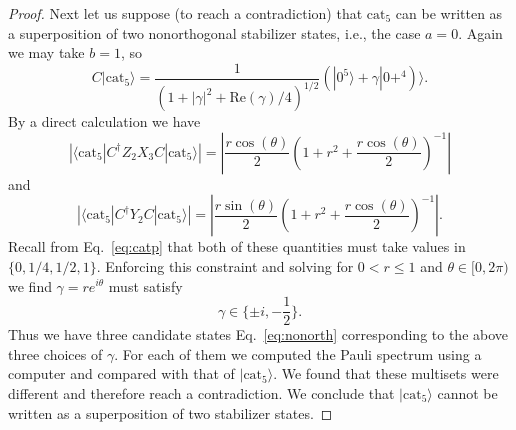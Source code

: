 \documentclass[a4paper,onecolumn,11pt,accepted=2021-11-11]{quantumarticle}
\newcommand{\cat}{\text{cat}}
\begin{document}
\begin{proof}
Next let us suppose  (to reach a contradiction) that $\cat_5$ can be written as a superposition of two nonorthogonal stabilizer states, i.e., the case $a=0$. Again we may take $b=1$, so 
\begin{equation}
C|\cat_5\rangle=\frac{1}{\left(1+|\gamma|^2+\mathrm{Re}(\gamma)/4\right)^{1/2}}(|0^5\rangle+\gamma |0+^{4})\rangle.
\label{eq:nonorth}
\end{equation}
By a direct calculation we have
\[
\left|\langle \cat_5|C^{\dagger}Z_2X_3C|\cat_5\rangle\right|=\left|\frac{r\cos(\theta)}{2}\left(1+r^2+\frac{r\cos(\theta)}{2}\right)^{-1}\right|
\]
and
\[
\left|\langle \cat_5|C^{\dagger}Y_2C|\cat_5\rangle\right|=\left|\frac{r\sin(\theta)}{2}\left(1+r^2+\frac{r\cos(\theta)}{2}\right)^{-1}\right|.
\]
Recall from Eq.~\eqref{eq:catp} that both of these quantities must take values in $\{0,1/4,1/2,1\}$. Enforcing this constraint and solving for $0<r\leq 1$ and $\theta\in [0,2\pi)$ we find $\gamma=re^{i\theta}$ must satisfy
\[
\gamma \in \{\pm i,  -\frac{1}{2}\}.
\]
Thus we have three candidate states Eq.~\eqref{eq:nonorth} corresponding to the above three choices of $\gamma$. For  each of them we computed the Pauli spectrum using a computer and compared with that of $|\mathrm{cat}_5\rangle$. We found that these multisets were different and therefore reach a contradiction. We conclude that $|\mathrm{cat}_5\rangle$ cannot be written as a superposition of two stabilizer states.
\end{proof}
\end{document}
